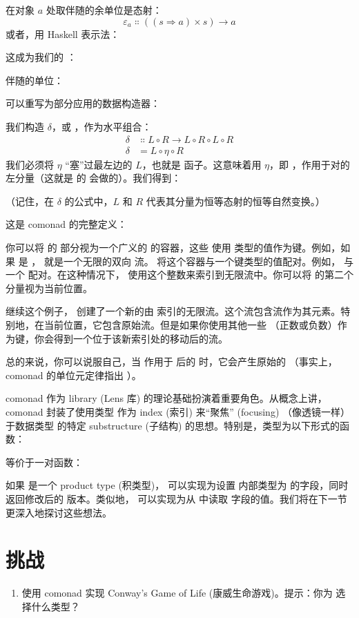 在对象 $a$ 处取伴随的余单位是态射：
\[\varepsilon_a \Colon ((s \Rightarrow a)\times{}s) \to a\]
或者，用 Haskell 表示法：

这成为我们的 ：

伴随的单位：

可以重写为部分应用的数据构造器：

我们构造 $\delta$，或 ，作为水平组合：
\begin{align*}
  \delta & \Colon L \circ R \to L \circ R \circ L \circ R \\
  \delta & = L \circ \eta \circ R
\end{align*}
我们必须将 $\eta$ “塞”过最左边的 $L$，也就是  函子。这意味着用 $\eta$，即 ，作用于对的左分量（这就是  的  会做的）。我们得到：

（记住，在 $\delta$ 的公式中，$L$ 和 $R$ 代表其分量为恒等态射的恒等自然变换。）

这是  comonad 的完整定义：

你可以将  的  部分视为一个广义的  的容器，这些  使用  类型的值作为键。例如，如果  是 ， 就是一个无限的双向  流。 将这个容器与一个键类型的值配对。例如， 与一个  配对。在这种情况下， 使用这个整数来索引到无限流中。你可以将  的第二个分量视为当前位置。

继续这个例子， 创建了一个新的由  索引的无限流。这个流包含流作为其元素。特别地，在当前位置，它包含原始流。但是如果你使用其他一些 （正数或负数）作为键，你会得到一个位于该新索引处的移动后的流。

总的来说，你可以说服自己，当  作用于  后的  时，它会产生原始的 （事实上，comonad 的单位元定律指出 ）。

 comonad 作为  library (Lens 库) 的理论基础扮演着重要角色。从概念上讲， comonad 封装了使用类型  作为 index (索引) 来“聚焦” (focusing) （像透镜一样）于数据类型  的特定 substructure (子结构) 的思想。特别是，类型为以下形式的函数：

等价于一对函数：

如果  是一个 product type (积类型)， 可以实现为设置  内部类型为  的字段，同时返回修改后的  版本。类似地， 可以实现为从  中读取  字段的值。我们将在下一节更深入地探讨这些想法。

\section{挑战}

\begin{enumerate}
  \tightlist
  \item
        使用  comonad 实现 Conway's Game of Life (康威生命游戏)。提示：你为  选择什么类型？
\end{enumerate}
